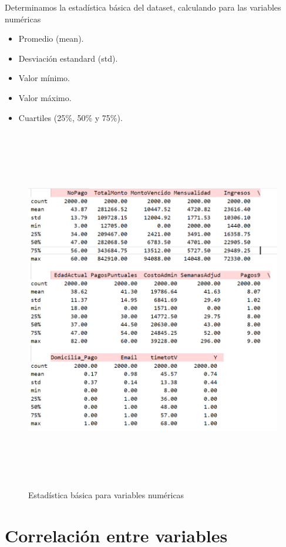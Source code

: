 Determinamos la estadística básica del dataset, calculando para las variables numéricas

\begin{itemize}
    \item Promedio (mean).
    \item Desviación estandard (std).
    \item Valor mínimo.
    \item Valor máximo.
    \item Cuartiles (25\%, 50\% y 75\%).
\end{itemize} \medskip


\begin{figure}[H]
    \centering
       \includegraphics[width=14cm, height=16cm ]{Imagenes/EstadisticaBasica.PNG}
      \caption{Estadística básica para variables numéricas}
      \label{fig:EstBasica}
\end{figure}

\section{Correlación entre variables}

